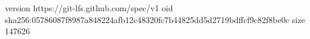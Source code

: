 version https://git-lfs.github.com/spec/v1
oid sha256:05786087f8987a848224afb12c48320fc7b44825dd5d2719bdffcf9c82f8be0c
size 147626
